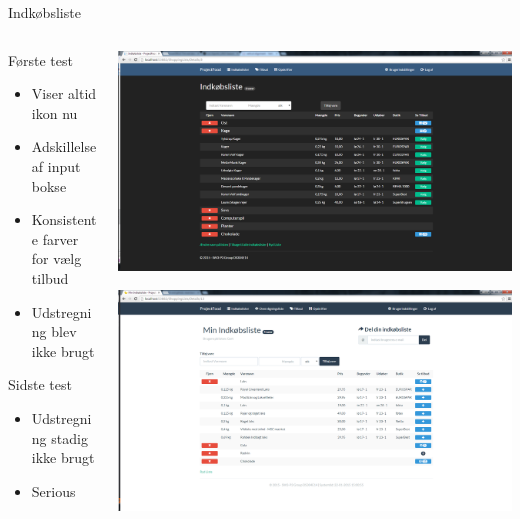 \begin{frame}{Indkøbsliste}
	
	\begin{minipage}[0.3\textheight]{\textwidth}
	\begin{columns}[T]
	\begin{column}{0.5\textwidth}
	 
	 Første test
	 \begin{itemize}
	 	\item Viser altid ikon nu
	 	\item Adskillelse af input bokse
	 	\item Konsistente farver for vælg tilbud
	 	\item Udstregning blev ikke brugt
	 \end{itemize}
	 Sidste test
	 \begin{itemize}
	 	\item Udstregning stadig ikke brugt
	 	\item Serious
	 \end{itemize}
	 
	\end{column}
	\begin{column}{0.5\textwidth}
	 \includegraphics[width=1\textwidth,height=1\textheight,keepaspectratio, trim={1cm 0 0 16mm}, clip]{images/Screenshots/ShoppingListOffersOld.png}
	 
	 \vspace{2 mm}
	  
	  \includegraphics[width=1\textwidth,height=1\textheight,keepaspectratio, trim={1cm 0 0 16mm}, clip]{images/Screenshots/ShoppingList.png}
	\end{column}
	\end{columns}
	


\end{minipage}
\end{frame}
